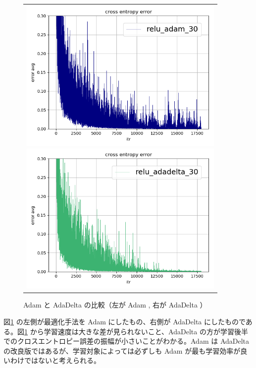 \documentclass[a4paper,dvipdfmx]{jsarticle}
\begin{document}
\begin{figure}[H]
  \begin{center}
    \begin{tabular}{c}
      \begin{minipage}{0.5\hsize}
        \begin{center}
          \includegraphics[clip, width=10.0cm]{./report_a4-5-1.png}
        \end{center}
      \end{minipage}
      \begin{minipage}{0.5\hsize}
        \begin{center}
          \includegraphics[clip, width=10.0cm]{./report_a4-5-2.png}
        \end{center}
      \end{minipage}
    \end{tabular}
    \caption{ Adam と AdaDelta の比較（左が Adam , 右が AdaDelta ）}
    \label{fig-A4-5-1}
  \end{center}
\end{figure}

図\ref{fig-A4-5-1} の左側が最適化手法を Adam にしたもの、右側が AdaDelta にしたものである。図\ref{fig-A4-5-1} から学習速度は大きな差が見られないこと、AdaDelta の方が学習後半でのクロスエントロピー誤差の振幅が小さいことがわかる。Adam は AdaDelta の改良版ではあるが、学習対象によっては必ずしも Adam が最も学習効率が良いわけではないと考えられる。
\end{document}
